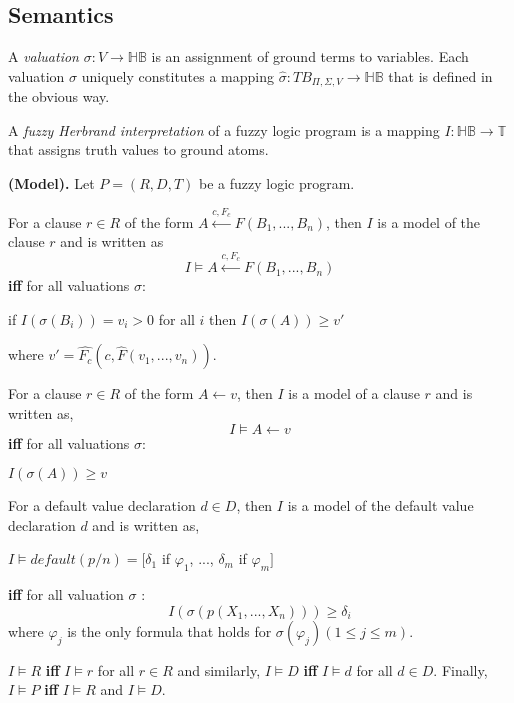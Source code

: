 \subsection{Semantics}
\label{sec:RFuzzyFrameworkSemantics}
A \textit{valuation} $\sigma : V \rightarrow \mathbb{HB}$ is an assignment of ground terms to variables. Each valuation $\sigma$ uniquely constitutes a mapping $\hat{\sigma} : TB_{\Pi,\Sigma,V} \rightarrow \mathbb{HB}$ that is defined in the obvious way.

A \textit{fuzzy Herbrand interpretation} of a fuzzy logic program is a mapping $I : \mathbb{HB} \rightarrow \mathbb{T}$ that assigns truth values to ground atoms.

\begin{defin}\textbf{(Model).}
\label{def:Model}
Let $P=(R,D,T)$ be a fuzzy logic program.

For a clause $r\in R$ of the form $A \stackrel{c,F_c}{\longleftarrow} F(B_1,...,B_n)$, then $I$ is a model of the clause $r$ and is written as 
\[I \models A \stackrel{c,F_c}{\longleftarrow} F(B_1,...,B_n)\]
\textbf{iff} for all valuations $\sigma$:
\begin{center}
 if $I(\sigma(B_i))=v_i>0$ for all $i$ then $I(\sigma(A))\geq v'$
\end{center}
where $v'= \hat{F_c}(c,\hat{F}(v_1,...,v_n))$.

For a clause $r \in R$ of the form $A \leftarrow v$, then $I$ is a model of a clause $r$ and is written as,
\[I \models A \leftarrow v\]
\textbf{iff} for all valuations $\sigma$:
\begin{center}
 $I(\sigma(A)) \geq v$
\end{center}

For a default value declaration $d \in D$, then $I$ is a model of the default value declaration $d$ and is written as,
\begin{center}
$I \models default(p/n)=[\delta_1$ if $\varphi_1$, ..., $\delta_m$ if $\varphi_m]$
\end{center}
\textbf{iff} for all valuation $\sigma$ :
\[I(\sigma(p(X_1, ..., X_n))) \geq \delta_i\]
where $\varphi_j$ is the only formula that holds for $\sigma(\varphi_j)(1 \leq j \leq m)$.
\end{defin}

$I \models R$ \textbf{iff} $I \models r$ for all $r \in R$ and similarly, $I \models D$ \textbf{iff} $I \models d$ for all $d \in D$.
Finally, $I \models P$ \textbf{iff} $I \models R$ and $I \models D$.
